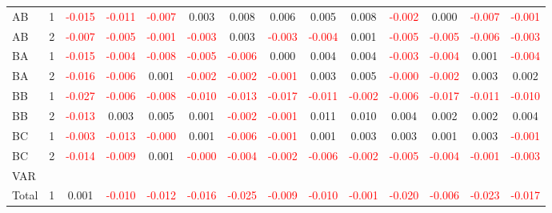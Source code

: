 \begin{table}[!htb]
{\begin{tabular}{llcccccccccccc}
AB & 1 & \textcolor{red}{-0.015} & \textcolor{red}{-0.011} & \textcolor{red}{-0.007} & 0.003 & 0.008 & 0.006 & 0.005 & 0.008 & \textcolor{red}{-0.002} & 0.000 & \textcolor{red}{-0.007} & \textcolor{red}{-0.001}\\
AB & 2 & \textcolor{red}{-0.007} & \textcolor{red}{-0.005} & \textcolor{red}{-0.001} & \textcolor{red}{-0.003} & 0.003 & \textcolor{red}{-0.003} & \textcolor{red}{-0.004} & 0.001 & \textcolor{red}{-0.005} & \textcolor{red}{-0.005} & \textcolor{red}{-0.006} & \textcolor{red}{-0.003}\\
BA & 1 & \textcolor{red}{-0.015} & \textcolor{red}{-0.004} & \textcolor{red}{-0.008} & \textcolor{red}{-0.005} & \textcolor{red}{-0.006} & 0.000 & 0.004 & 0.004 & \textcolor{red}{-0.003} & \textcolor{red}{-0.004} & 0.001 & \textcolor{red}{-0.004}\\
BA & 2 & \textcolor{red}{-0.016} & \textcolor{red}{-0.006} & 0.001 & \textcolor{red}{-0.002} & \textcolor{red}{-0.002} & \textcolor{red}{-0.001} & 0.003 & 0.005 & \textcolor{red}{-0.000} & \textcolor{red}{-0.002} & 0.003 & 0.002\\
BB & 1 & \textcolor{red}{-0.027} & \textcolor{red}{-0.006} & \textcolor{red}{-0.008} & \textcolor{red}{-0.010} & \textcolor{red}{-0.013} & \textcolor{red}{-0.017} & \textcolor{red}{-0.011} & \textcolor{red}{-0.002} & \textcolor{red}{-0.006} & \textcolor{red}{-0.017} & \textcolor{red}{-0.011} & \textcolor{red}{-0.010}\\
BB & 2 & \textcolor{red}{-0.013} & 0.003 & 0.005 & 0.001 & \textcolor{red}{-0.002} & \textcolor{red}{-0.001} & 0.011 & 0.010 & 0.004 & 0.002 & 0.002 & 0.004\\
BC & 1 & \textcolor{red}{-0.003} & \textcolor{red}{-0.013} & \textcolor{red}{-0.000} & 0.001 & \textcolor{red}{-0.006} & \textcolor{red}{-0.001} & 0.001 & 0.003 & 0.003 & 0.001 & 0.003 & \textcolor{red}{-0.001}\\
BC & 2 & \textcolor{red}{-0.014} & \textcolor{red}{-0.009} & 0.001 & \textcolor{red}{-0.000} & \textcolor{red}{-0.004} & \textcolor{red}{-0.002} & \textcolor{red}{-0.006} & \textcolor{red}{-0.002} & \textcolor{red}{-0.005} & \textcolor{red}{-0.004} & \textcolor{red}{-0.001} & \textcolor{red}{-0.003}\\
\hline
VAR &  &  &  &  &  &  &  &  &  &  &  &  & \\
\hline
Total & 1 & 0.001 & \textcolor{red}{-0.010} & \textcolor{red}{-0.012} & \textcolor{red}{-0.016} & \textcolor{red}{-0.025} & \textcolor{red}{-0.009} & \textcolor{red}{-0.010} & \textcolor{red}{-0.001} & \textcolor{red}{-0.020} & \textcolor{red}{-0.006} & \textcolor{red}{-0.023} & \textcolor{red}{-0.017}\\

\end{tabular}}
\end{table}
